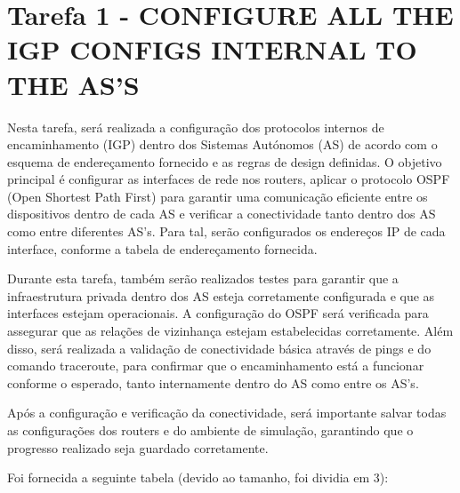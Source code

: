 \documentclass[11pt,english, openright, oneside]{book}
\begin{document}
\section{Tarefa 1 - CONFIGURE ALL THE IGP CONFIGS INTERNAL TO THE AS’S}
\vspace{0.2cm}

Nesta tarefa, será realizada a configuração dos protocolos internos de encaminhamento (IGP) dentro dos Sistemas Autónomos (AS) de acordo com o esquema de endereçamento fornecido e as regras de design definidas. O objetivo principal é configurar as interfaces de rede nos routers, aplicar o protocolo OSPF (Open Shortest Path First) para garantir uma comunicação eficiente entre os dispositivos dentro de cada AS e verificar a conectividade tanto dentro dos AS como entre diferentes AS’s. Para tal, serão configurados os endereços IP de cada interface, conforme a tabela de endereçamento fornecida.
\vspace{0.2cm}

Durante esta tarefa, também serão realizados testes para garantir que a infraestrutura privada dentro dos AS esteja corretamente configurada e que as interfaces estejam operacionais. A configuração do OSPF será verificada para assegurar que as relações de vizinhança estejam estabelecidas corretamente. Além disso, será realizada a validação de conectividade básica através de pings e do comando traceroute, para confirmar que o encaminhamento está a funcionar conforme o esperado, tanto internamente dentro do AS como entre os AS’s.
\vspace{0.2cm}

Após a configuração e verificação da conectividade, será importante salvar todas as configurações dos routers e do ambiente de simulação, garantindo que o progresso realizado seja guardado corretamente.

\vspace{0.2cm}

Foi fornecida a seguinte tabela (devido ao tamanho, foi dividia em 3):
\end{document}
